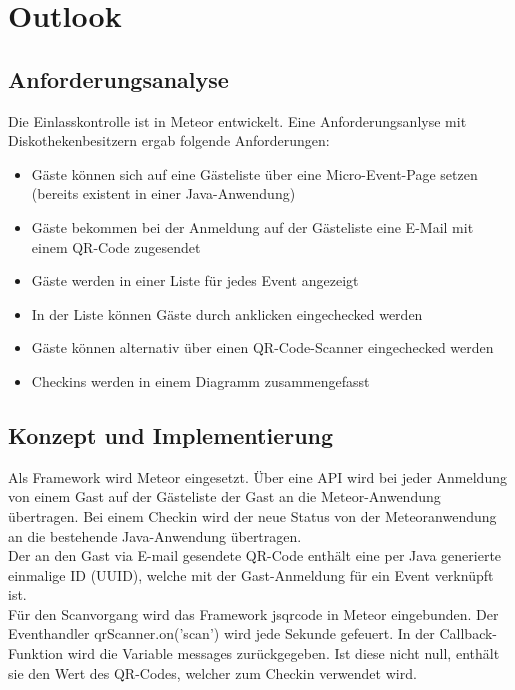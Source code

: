 \documentclass[a4paper]{spie}  %
\begin{document}
\newpage

\newpage
\appendix
\section{Outlook} \label{subsection:Einlasskontrolle}
\subsection{Anforderungsanalyse}
Die Einlasskontrolle ist in Meteor entwickelt. Eine Anforderungsanlyse mit Diskothekenbesitzern ergab folgende Anforderungen:

\begin{itemize}
\item Gäste können sich auf eine Gästeliste über eine Micro-Event-Page setzen (bereits existent in einer Java-Anwendung)
\item Gäste bekommen bei der Anmeldung auf der Gästeliste eine E-Mail mit einem QR-Code zugesendet
\item Gäste werden in einer Liste für jedes Event angezeigt
\item In der Liste können Gäste durch anklicken eingechecked werden
\item Gäste können alternativ über einen QR-Code-Scanner eingechecked werden
\item Checkins werden in einem Diagramm zusammengefasst
\end{itemize}
\subsection{Konzept und Implementierung}
Als Framework wird Meteor eingesetzt. Über eine API wird bei jeder Anmeldung von einem Gast auf der Gästeliste der Gast an die Meteor-Anwendung übertragen.
Bei einem Checkin wird der neue Status von der Meteoranwendung an die bestehende Java-Anwendung übertragen.
\\
Der an den Gast via E-mail gesendete QR-Code enthält eine per Java generierte einmalige ID (UUID), welche mit der Gast-Anmeldung für ein Event verknüpft ist.
\\
Für den Scanvorgang wird das Framework jsqrcode in Meteor eingebunden. Der Eventhandler qrScanner.on('scan') wird jede Sekunde gefeuert. In der Callback-Funktion wird die Variable messages zurückgegeben. Ist diese nicht null, enthält sie den Wert des QR-Codes, welcher zum Checkin verwendet wird.
\end{document}
